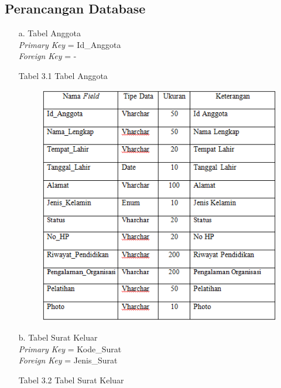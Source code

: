 \documentclass{jtetiproposalskripsi}
\begin{document}
\subsection{Perancangan Database}
\begin{itemize}
\item[a.] Tabel Anggota \\
\textit{Primary Key} = Id\_Anggota \\
\textit{Foreign Key} = -
\begin{center}
Tabel 3.1 Tabel Anggota
\end{center}
\vspace{-0.5cm}
\begin{figure}[ht!]
  \centering
    \includegraphics[width=15cm]{gambar/6}
\end{figure}
\newpage
\item[b.] Tabel Surat Keluar \\
\textit{Primary Key} = Kode\_Surat \\
\textit{Foreign Key} = Jenis\_Surat
\begin{center}
Tabel 3.2 Tabel Surat Keluar
\end{center}
\vspace{-0.5cm}
\begin{figure}[ht!]
  \centering

\end{figure}
\end{itemize}
\end{document}
